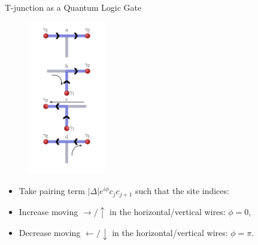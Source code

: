 \documentclass[xcolor=dvipsnames,10pt,aspectratio=169]{beamer}
\newcommand{\ham}{\mathcal{H}}
\newcommand{\cc}{c^{\dagger}}
\newcommand{\de}{\Delta}
\begin{document}
  \begin{frame}{T-junction as a Quantum Logic Gate}

    \begin{multicols}{3}
    \begin{figure}
      \includegraphics[width=0.30\textwidth]{./figures/t-junction-braid.pdf}
    \end{figure}

      \begin{minipage}{0.67\textwidth}
      \small
      \vspace{4em}
      \begin{itemize}
        \footnotesize
        \item Take pairing term $|\de|e^{i\phi} c_j c_{j+1}$ such that the site indices:
        \item Increase moving $\rightarrow / \uparrow$ in the horizontal/vertical wires: $\phi=0$,
        \item Decrease moving $\leftarrow / \downarrow$ in the horizontal/vertical wires: $\phi=\pi$.
      \end{itemize}


\end{minipage}
\end{multicols}
\end{frame}
\end{document}
